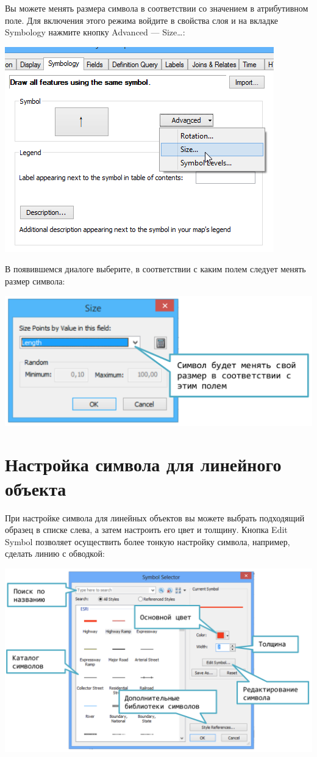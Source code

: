 \documentclass[]{book}
\theoremstyle{definition}
\theoremstyle{definition}
\theoremstyle{definition}
\theoremstyle{remark}
\begin{document}
Вы можете менять размера символа в соответствии со значением в
атрибутивном поле. Для включения этого режима войдите в свойства слоя и
на вкладке Symbology нажмите кнопку Advanced --- Size\ldots{}:

\includegraphics{images/Appendix/image29.png}

В появившемся диалоге выберите, в соответствии с каким полем следует
менять размер символа:

\includegraphics{images/Appendix/image30.png}

\hypertarget{manual-vector-line}{%
\section{Настройка символа для линейного
объекта}\label{manual-vector-line}}

При настройке символа для линейных объектов вы можете выбрать подходящий
образец в списке слева, а затем настроить его цвет и толщину. Кнопка
Edit Symbol позволяет осуществить более тонкую настройку символа,
например, сделать линию с обводкой:

\includegraphics{images/Appendix/image31.png}
\end{document}
